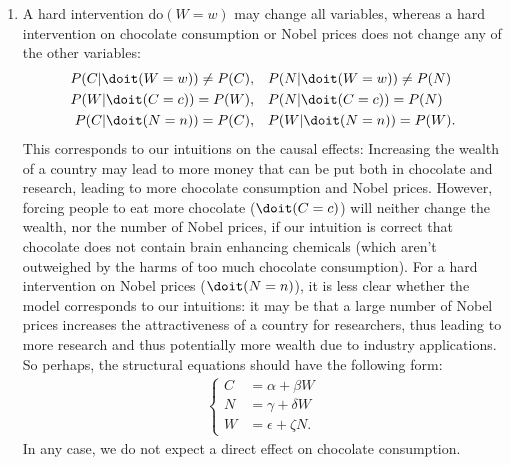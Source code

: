 \begin{enumerate}
  \begin{ungradedsolution}
    \begin{enumerate}
      \item A hard intervention do$(W = w)$ may change all variables, whereas a hard intervention on chocolate consumption or Nobel prices does not change any of the other variables:
      \begin{align*}
        P(C|\doit(W=w)) \neq P(C), & \quad P(N|\doit(W=w)) \neq P(N) \\
        P(W|\doit(C=c)) = P(W),    & \quad P(N|\doit(C=c)) = P(N)    \\
        P(C|\doit(N=n)) = P(C),    & \quad P(W|\doit(N=n)) = P(W).
      \end{align*}
      This corresponds to our intuitions on the causal effects:
      Increasing the wealth of a country may lead to more money that can be put both in chocolate and research, leading to more chocolate consumption and Nobel prices.
      However, forcing people to eat more chocolate ($\doit(C=c)$) will neither change the wealth, nor the number of Nobel prices, if our intuition is correct that chocolate does not contain brain enhancing chemicals (which aren't outweighed by the harms of too much chocolate consumption).
      For a hard intervention on Nobel prices ($\doit(N=n)$), it is less clear whether the model corresponds to our intuitions: it may be that a large number of Nobel prices increases the attractiveness of a country for researchers, thus leading to more research and thus potentially more wealth due to industry applications. So perhaps, the structural equations should have the following form:
      \begin{align*}
        \begin{cases}
          C & = \alpha + \beta W    \\
          N & = \gamma + \delta W   \\
          W & = \epsilon + \zeta N.
        \end{cases}
      \end{align*}
      In any case, we do not expect a direct effect on chocolate consumption.
    \end{enumerate}
  \end{ungradedsolution}


\end{enumerate}
